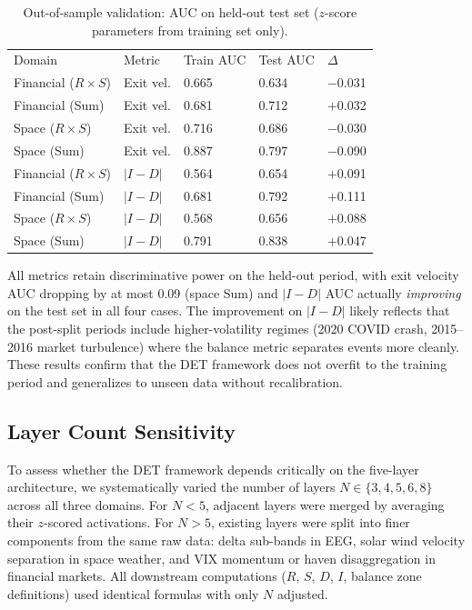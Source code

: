 \documentclass[aip,cha,reprint,amsmath,amssymb,final,floatfix]{revtex4-2}
\begin{document}
\begin{table}[!htbp]
\caption[Out-of-sample validation AUC on held-out test set for financial and space weather domains]{\label{tab:oos}Out-of-sample validation: AUC on held-out test set ($z$-score parameters from training set only).}
\begin{ruledtabular}
\begin{tabular}{lllll}
Domain & Metric & Train AUC & Test AUC & $\Delta$ \\
Financial ($R \times S$) & Exit vel. & 0.665 & 0.634 & $-$0.031 \\
Financial (Sum) & Exit vel. & 0.681 & 0.712 & $+$0.032 \\
Space ($R \times S$) & Exit vel. & 0.716 & 0.686 & $-$0.030 \\
Space (Sum) & Exit vel. & 0.887 & 0.797 & $-$0.090 \\
Financial ($R \times S$) & $|I{-}D|$ & 0.564 & 0.654 & $+$0.091 \\
Financial (Sum) & $|I{-}D|$ & 0.681 & 0.792 & $+$0.111 \\
Space ($R \times S$) & $|I{-}D|$ & 0.568 & 0.656 & $+$0.088 \\
Space (Sum) & $|I{-}D|$ & 0.791 & 0.838 & $+$0.047 \\
\end{tabular}
\end{ruledtabular}
\end{table}

All metrics retain discriminative power on the held-out period, with exit velocity AUC dropping by at most 0.09 (space Sum) and $|I{-}D|$ AUC actually \emph{improving} on the test set in all four cases. The improvement on $|I{-}D|$ likely reflects that the post-split periods include higher-volatility regimes (2020 COVID crash, 2015--2016 market turbulence) where the balance metric separates events more cleanly. These results confirm that the DET framework does not overfit to the training period and generalizes to unseen data without recalibration.

\subsection{Layer Count Sensitivity}

To assess whether the DET framework depends critically on the five-layer architecture, we systematically varied the number of layers $N \in \{3, 4, 5, 6, 8\}$ across all three domains. For $N < 5$, adjacent layers were merged by averaging their $z$-scored activations. For $N > 5$, existing layers were split into finer components from the same raw data: delta sub-bands in EEG, solar wind velocity separation in space weather, and VIX momentum or haven disaggregation in financial markets. All downstream computations ($R$, $S$, $D$, $I$, balance zone definitions) used identical formulas with only $N$ adjusted.
\end{document}
